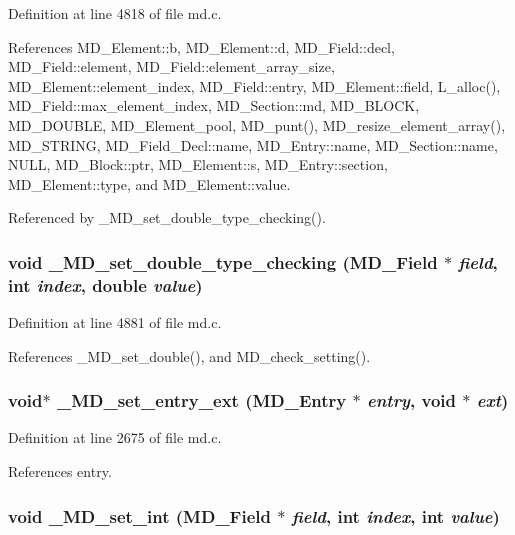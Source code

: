 Definition at line 4818 of file md.c.

References MD\_\-Element::b, MD\_\-Element::d, MD\_\-Field::decl, MD\_\-Field::element, MD\_\-Field::element\_\-array\_\-size, MD\_\-Element::element\_\-index, MD\_\-Field::entry, MD\_\-Element::field, L\_\-alloc(), MD\_\-Field::max\_\-element\_\-index, MD\_\-Section::md, MD\_\-BLOCK, MD\_\-DOUBLE, MD\_\-Element\_\-pool, MD\_\-punt(), MD\_\-resize\_\-element\_\-array(), MD\_\-STRING, MD\_\-Field\_\-Decl::name, MD\_\-Entry::name, MD\_\-Section::name, NULL, MD\_\-Block::ptr, MD\_\-Element::s, MD\_\-Entry::section, MD\_\-Element::type, and MD\_\-Element::value.

Referenced by \_\-MD\_\-set\_\-double\_\-type\_\-checking().
\subsubsection{\setlength{\rightskip}{0pt plus 5cm}void \_\-MD\_\-set\_\-double\_\-type\_\-checking (\bf{MD\_\-Field} $\ast$ {\em field}, int {\em index}, double {\em value})}\label{md_8h_52b524532a8c1924943ca7e6108e35bc}




Definition at line 4881 of file md.c.

References \_\-MD\_\-set\_\-double(), and MD\_\-check\_\-setting().
\subsubsection{\setlength{\rightskip}{0pt plus 5cm}void$\ast$ \_\-MD\_\-set\_\-entry\_\-ext (\bf{MD\_\-Entry} $\ast$ {\em entry}, void $\ast$ {\em ext})}\label{md_8h_2aa83a9864c4b791e5724a9d343f3e1d}




Definition at line 2675 of file md.c.

References entry.
\subsubsection{\setlength{\rightskip}{0pt plus 5cm}void \_\-MD\_\-set\_\-int (\bf{MD\_\-Field} $\ast$ {\em field}, int {\em index}, int {\em value})}\label{md_8h_78638c962f83ab4e8c35c2aa92d23a1f}




